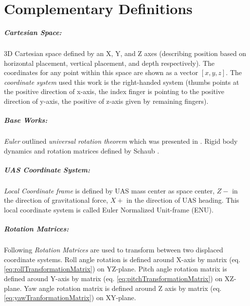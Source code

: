 \cleardoublepage
\appendix
\chapter{Complementary Definitions}\label{sec:complementsOfAlgebra}

\paragraph{Cartesian Space:} 3D Cartesian space defined by an X, Y, and Z axes (describing position based on horizontal placement, vertical placement, and depth respectively). The coordinates for any point within this space are shown as a vector $[x,y,z]$. The \emph{coordinate system} used this work is the right-handed system (thumbs points at the positive direction of x-axis, the index finger is pointing to the positive direction of y-axis, the positive  of z-axis given by remaining fingers).

\paragraph{Base Works:}\emph{Euler} outlined \emph{universal rotation theorem} which was presented in \cite{euler1775formulae}. Rigid body dynamics and rotation matrices defined by Schaub \cite{schaub2003analytical}. 

\paragraph{UAS Coordinate System:} \emph{Local Coordinate frame} is defined by UAS mass center as space center, $Z-$ in the direction of gravitational force, $X+$ in the direction of UAS heading. This local coordinate system is called Euler Normalized Unit-frame (ENU). 

\paragraph{Rotation Matrices:} Following \emph{Rotation Matrices} are used to transform between two displaced coordinate systems. Roll angle rotation is defined around X-axis by matrix (eq. \ref{eq:rollTransformationMatrix}) on YZ-plane. Pitch angle  rotation matrix is defined around Y-axis by matrix (eq. \ref{eq:pitchTransformationMatrix}) on XZ-plane. Yaw angle rotation matrix is defined around Z axis by matrix (eq. \ref{eq:yawTranformationMatrix}) on XY-plane.

